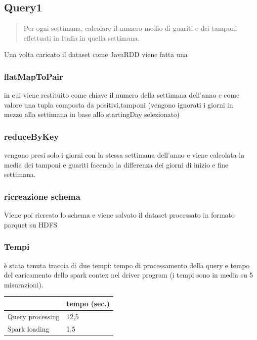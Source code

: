\documentclass[acmsmall]{acmart}
\begin{document}
\subsection{Query1}
\begin{quote}
Per ogni settimana, calcolare il numero medio di guariti e dei tamponi effettuati in Italia in quella
settimana.\end{quote}

Una volta caricato il dataset come JavaRDD viene fatta una 

\subsubsection{flatMapToPair} 
in cui viene restituito 
come chiave il numero della settimana dell'anno e come valore una tupla composta da positivi,tamponi (vengono ignorati i giorni in mezzo alla settimana in base allo startingDay selezionato)

\subsubsection{reduceByKey}
vengono presi solo i giorni con la stessa settimana dell'anno e viene calcolata la media dei tamponi e guariti facendo la differenza dei giorni di inizio e fine settimana.
\subsubsection{ricreazione schema}
Viene poi ricreato lo schema e viene salvato il dataset processato in formato parquet su HDFS

\subsubsection{Tempi}
è stata tenuta traccia di due tempi: tempo di processamento della query e tempo del caricamento dello spark contex nel driver program (i tempi sono in media su 5 misurazioni).

\hspace{40mm} \begin{tabular}{l|l|}
\cline{2-2}
                                       & tempo (sec.) \\ \hline
\multicolumn{1}{|l|}{Query processing} &   12,5         \\ \hline
\multicolumn{1}{|l|}{Spark loading}    &   1,5           \\ \hline
\end{tabular}
\end{document}
